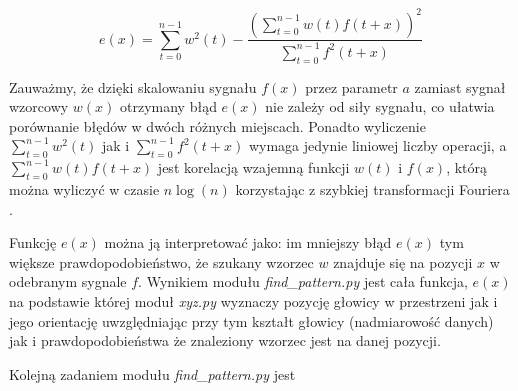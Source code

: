 \[
  e(x) = \sum_{t=0}^{n-1}  w^2(t)  - \frac {(\sum\limits_{t=0}^{n-1}  w(t) f(t+x) )^2 } { \sum\limits_{t=0}^{n-1} f^2(t+x)}
\]

Zauważmy, że dzięki skalowaniu sygnału $f(x)$ przez parametr $a$ zamiast sygnał wzorcowy $w(x)$
otrzymany błąd $e(x)$ nie zależy od siły sygnału, co ułatwia porównanie błędów w dwóch różnych miejscach.
Ponadto wyliczenie $ \sum\limits_{t=0}^{n-1}  w^2(t) $ 
jak i $\sum\limits_{t=0}^{n-1} f^2(t+x)$ wymaga jedynie liniowej liczby operacji, a 
 $\sum\limits_{t=0}^{n-1}  w(t) f(t+x)  $ jest korelacją wzajemną funkcji $w(t)$ i $f(x)$, którą
 można wyliczyć w czasie $n \log(n)$ korzystając z szybkiej transformacji Fouriera \cite{bib:FFT_correlation}.
 
 Funkcję $e(x)$  można ją interpretować jako:
 im mniejszy błąd $e(x)$ tym większe prawdopodobieństwo, że szukany wzorzec $w$ znajduje się na pozycji $x$ w 
 odebranym sygnale $f$. 
 Wynikiem modułu \textit{find\_pattern.py} jest cała funkcja, $e(x)$ na podstawie której moduł \textit{xyz.py}
 wyznaczy pozycję głowicy w przestrzeni jak i jego orientację uwzględniając przy tym 
 kształt głowicy (nadmiarowość danych) jak i prawdopodobieństwa że znaleziony wzorzec jest na danej pozycji.
 
 Kolejną zadaniem modułu \textit{find\_pattern.py} jest 